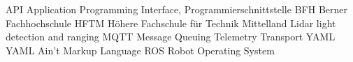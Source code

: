 \documentclass[11pt,english,german]{report}
\begin{document}
   {API}   {Application Programming Interface, Programmierschnittstelle}
   {BFH}   {Berner Fachhochschule}
  {HFTM}  {Höhere Fachschule für Technik Mittelland}
 {Lidar} {light detection and ranging}
  {MQTT}  {Message Queuing Telemetry Transport}
  {YAML}  {YAML Ain’t Markup Language}
   {ROS}   {Robot Operating System}

\printglossary[title=Glossar]

\printglossary[type=\acronymtype, title=Abkürzungsverzeichnis]

\printbibliography[heading=bibintoc]

%
\end{document}
